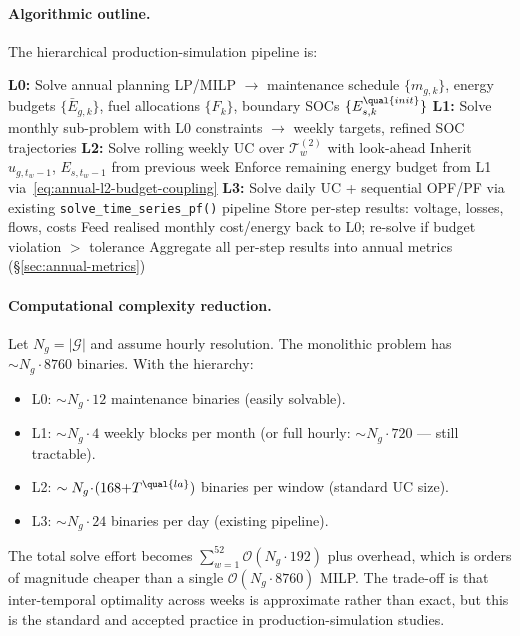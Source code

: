 \paragraph{Algorithmic outline.}
The hierarchical production-simulation pipeline is:

\begin{algorithmic}[1]
  \State \textbf{L0:} Solve annual planning LP/MILP $\to$ maintenance schedule
    $\{m_{g,k}\}$, energy budgets $\{\bar E_{g,k}\}$, fuel allocations
    $\{F_k\}$, boundary SOCs $\{E_{s,k}^{\qual{init}}\}$
    \State \textbf{L1:} Solve monthly sub-problem with L0 constraints $\to$
      weekly targets, refined SOC trajectories
      \State \textbf{L2:} Solve rolling weekly UC over
        $\mathcal{T}^{(2)}_w$ with look-ahead
      \State Inherit $u_{g,t_w{-}1}$, $E_{s,t_w{-}1}$ from previous week
      \State Enforce remaining energy budget from L1
        via~\eqref{eq:annual-l2-budget-coupling}
        \State \textbf{L3:} Solve daily UC + sequential OPF/PF via existing
          \texttt{solve\_time\_series\_pf()} pipeline
        \State Store per-step results: voltage, losses, flows, costs
      \EndFor
    \EndFor
      \State Feed realised monthly cost/energy back to L0; re-solve if
        budget violation $>$ tolerance
    \EndIf
  \EndFor
  \State Aggregate all per-step results into annual metrics
    (\S\ref{sec:annual-metrics})
\EndProcedure
\end{algorithmic}

\paragraph{Computational complexity reduction.}
Let \(N_g=|\mathcal{G}|\) and assume hourly resolution.  The monolithic problem
has \(\sim N_g\!\cdot\!8760\) binaries.  With the hierarchy:
\begin{itemize}
\item L0: \(\sim N_g\!\cdot\!12\) maintenance binaries (easily solvable).
\item L1: \(\sim N_g\!\cdot\!4\) weekly blocks per month
  (or full hourly: \(\sim N_g\!\cdot\!720\) --- still tractable).
\item L2: \(\sim N_g\!\cdot\!(168{+}T^{\qual{la}})\) binaries per window
  (standard UC size).
\item L3: \(\sim N_g\!\cdot\!24\) binaries per day (existing pipeline).
\end{itemize}
The total solve effort becomes \(\sum_{w=1}^{52}\mathcal{O}(N_g\!\cdot\!192)\)
plus overhead, which is orders of magnitude cheaper than a single
\(\mathcal{O}(N_g\!\cdot\!8760)\) MILP.  The trade-off is that inter-temporal
optimality across weeks is approximate rather than exact, but this is the
standard and accepted practice in production-simulation studies.

